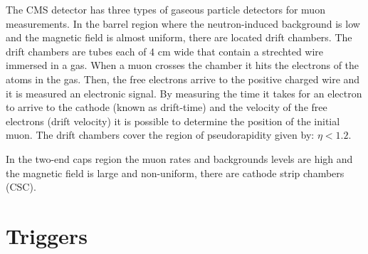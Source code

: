 The CMS detector has three types of gaseous particle detectors for muon measurements. In the barrel region where the neutron-induced background is low and the magnetic field is almost uniform, there are located drift chambers. The drift chambers are tubes each of 4 cm wide that contain a strechted wire immersed in a gas. When a muon crosses the chamber it hits the electrons of the atoms in the gas. Then, the free electrons arrive to the positive charged wire and it is measured an electronic signal. By measuring the time it takes for an electron to arrive to the cathode (known as drift-time) and the velocity of the free electrons (drift velocity) it is possible to determine the position of the initial muon. The drift chambers cover the region of pseudorapidity given by: $\eta < 1.2$.
  
In the two-end caps region the muon rates and backgrounds levels are high and the magnetic field is large and non-uniform, there are cathode strip chambers (CSC).




\section{Triggers}








